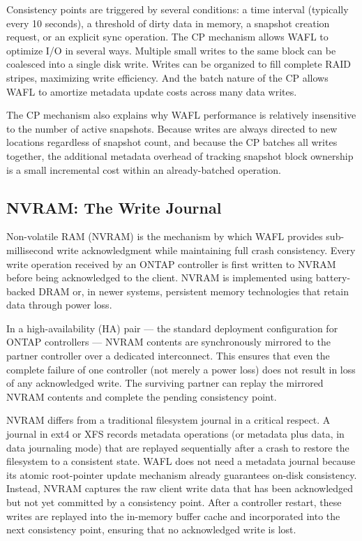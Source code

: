 Consistency points are triggered by several conditions: a time interval (typically every 10 seconds), a threshold of dirty data in memory, a snapshot creation request, or an explicit sync operation. The CP mechanism allows WAFL to optimize I/O in several ways. Multiple small writes to the same block can be coalesced into a single disk write. Writes can be organized to fill complete RAID stripes, maximizing write efficiency. And the batch nature of the CP allows WAFL to amortize metadata update costs across many data writes.

The CP mechanism also explains why WAFL performance is relatively insensitive to the number of active snapshots. Because writes are always directed to new locations regardless of snapshot count, and because the CP batches all writes together, the additional metadata overhead of tracking snapshot block ownership is a small incremental cost within an already-batched operation.

\subsection{NVRAM: The Write Journal}

Non-volatile RAM (NVRAM) is the mechanism by which WAFL provides sub-millisecond write acknowledgment while maintaining full crash consistency. Every write operation received by an ONTAP controller is first written to NVRAM before being acknowledged to the client. NVRAM is implemented using battery-backed DRAM or, in newer systems, persistent memory technologies that retain data through power loss.

In a high-availability (HA) pair --- the standard deployment configuration for ONTAP controllers --- NVRAM contents are synchronously mirrored to the partner controller over a dedicated interconnect. This ensures that even the complete failure of one controller (not merely a power loss) does not result in loss of any acknowledged write. The surviving partner can replay the mirrored NVRAM contents and complete the pending consistency point.

NVRAM differs from a traditional filesystem journal in a critical respect. A journal in ext4 or XFS records metadata operations (or metadata plus data, in data journaling mode) that are replayed sequentially after a crash to restore the filesystem to a consistent state. WAFL does not need a metadata journal because its atomic root-pointer update mechanism already guarantees on-disk consistency. Instead, NVRAM captures the raw client write data that has been acknowledged but not yet committed by a consistency point. After a controller restart, these writes are replayed into the in-memory buffer cache and incorporated into the next consistency point, ensuring that no acknowledged write is lost.

